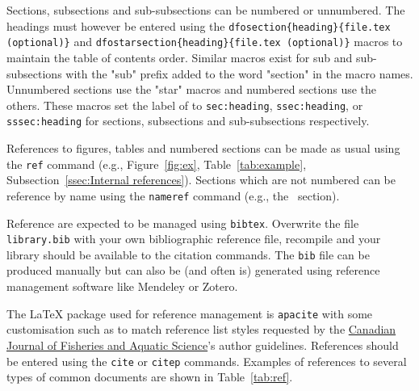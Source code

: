Sections, subsections and sub-subsections can be numbered or unnumbered. The headings must however be entered using the \texttt{dfosection\{heading\}\{file.tex (optional)\}} and \texttt{dfostarsection\{heading\}\{file.tex (optional)\}} macros to maintain the table of contents order. Similar macros exist for sub and sub-subsections with the "sub" prefix added to the word "section" in the macro names. Unnumbered sections use the "star" macros and numbered sections use the others. These macros set the label of to \texttt{sec:heading}, \texttt{ssec:heading}, or \texttt{sssec:heading} for sections, subsections and sub-subsections respectively.


References to figures, tables and numbered sections can be made as usual using the \texttt{ref} command (e.g., Figure~\ref{fig:ex}, Table~\ref{tab:example}, Subsection~\ref{ssec:Internal references}). Sections which are not numbered can be reference by name using the \texttt{nameref} command (e.g., the~ section).


Reference are expected to be managed using \texttt{bibtex}. Overwrite the file \texttt{library.bib} with your own bibliographic reference file, recompile and your library should be available to the citation commands. The \texttt{bib} file can be produced manually but can also be (and often is) generated using reference management software like Mendeley or Zotero.

The LaTeX package used for reference management is \texttt{apacite} with some customisation such as to match reference list styles requested by the \href{https://cdnsciencepub.com/journal/cjfas}{Canadian Journal of Fisheries and Aquatic Science}'s author guidelines. References should be entered using the \texttt{cite} or \texttt{citep} commands. Examples of references to several types of common documents are shown in Table~\ref{tab:ref}.

